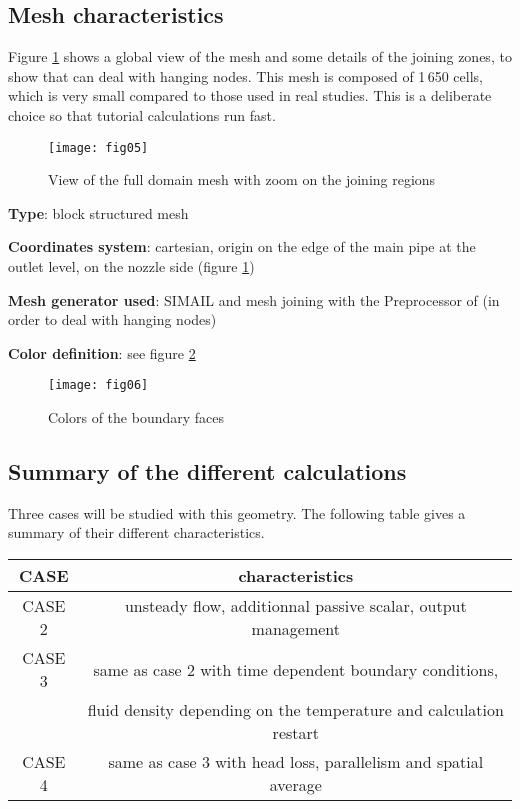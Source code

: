         \subsection{Mesh characteristics}

Figure \ref{figante22} shows a global view of the mesh and some details of
the joining zones, to show that \CS can deal with hanging nodes.
This mesh is composed of 1\,650 cells, which is very small compared to those used in real
studies. This is a deliberate choice so that tutorial calculations run fast.

\begin{figure}[h!]
\begin{center}
\texttt{[image: fig05]}
\caption{View of the full domain mesh with zoom on the joining regions}
\label{figante22}
\end{center}
\end{figure}

{\bfseries Type}: block structured mesh

{\bfseries Coordinates system}: cartesian, origin on the edge of the main
pipe at the outlet level, on the nozzle side (figure \ref{figante22})

{\bfseries Mesh generator used}: SIMAIL and mesh joining with the Preprocessor
of \CS (in order to deal with hanging nodes)

{\bfseries Color definition}: see figure \ref{figante23}

\begin{figure}[h!]
\begin{center}
\texttt{[image: fig06]}
\caption{Colors of the boundary faces}
\label{figante23}
\end{center}
\end{figure}


        \subsection{Summary of the different calculations}

Three cases will be studied with this geometry. The following table gives a
summary of their different characteristics.
\begin{center}
\begin{tabular}{|c|c|}
\hline
CASE & characteristics \\
\hline
CASE 2 & unsteady flow, additionnal passive scalar, output management \\
\hline
CASE 3 & same as case 2 with time dependent boundary conditions, \\
 &       fluid density depending on the temperature and calculation restart\\
\hline
CASE 4 & same as case 3 with head loss, parallelism and spatial average \\
\hline
\end{tabular}
\end{center}


